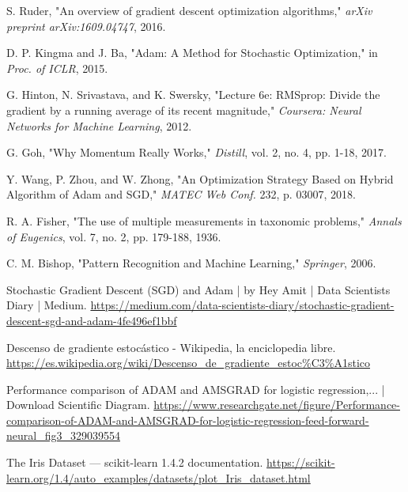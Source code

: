 \documentclass[12pt, spanish]{article}
\begin{document}
\begin{thebibliography}{99}
S. Ruder, "An overview of gradient descent optimization algorithms," \textit{arXiv preprint arXiv:1609.04747}, 2016.

D. P. Kingma and J. Ba, "Adam: A Method for Stochastic Optimization," in \textit{Proc. of ICLR}, 2015.

G. Hinton, N. Srivastava, and K. Swersky, "Lecture 6e: RMSprop: Divide the gradient by a running average of its recent magnitude," \textit{Coursera: Neural Networks for Machine Learning}, 2012.

G. Goh, "Why Momentum Really Works," \textit{Distill}, vol. 2, no. 4, pp. 1-18, 2017.

Y. Wang, P. Zhou, and W. Zhong, "An Optimization Strategy Based on Hybrid Algorithm of Adam and SGD," \textit{MATEC Web Conf.} 232, p. 03007, 2018.

R. A. Fisher, "The use of multiple measurements in taxonomic problems," \textit{Annals of Eugenics}, vol. 7, no. 2, pp. 179-188, 1936.

C. M. Bishop, "Pattern Recognition and Machine Learning," \textit{Springer}, 2006.

Stochastic Gradient Descent (SGD) and Adam | by Hey Amit | Data Scientists Diary | Medium. \url{https://medium.com/data-scientists-diary/stochastic-gradient-descent-sgd-and-adam-4fe496ef1bbf}

Descenso de gradiente estocástico - Wikipedia, la enciclopedia libre. \url{https://es.wikipedia.org/wiki/Descenso_de_gradiente_estoc\%C3\%A1stico}

Performance comparison of ADAM and AMSGRAD for logistic regression,... | Download Scientific Diagram. \url{https://www.researchgate.net/figure/Performance-comparison-of-ADAM-and-AMSGRAD-for-logistic-regression-feed-forward-neural_fig3_329039554}

The Iris Dataset — scikit-learn 1.4.2 documentation. \url{https://scikit-learn.org/1.4/auto_examples/datasets/plot_Iris_dataset.html}
\end{thebibliography}
\end{document}
